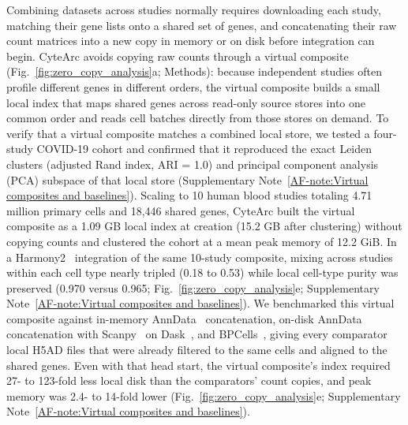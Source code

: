 \documentclass[11pt]{article}
\newcommand{\sref}[1]{\ref*{AF-#1}}
\begin{document}
Combining datasets across studies normally requires downloading each study, matching their gene lists onto a shared set of genes, and concatenating their raw count matrices into a new copy in memory or on disk before integration can begin. CyteArc avoids copying raw counts through a virtual composite (Fig.~\ref{fig:zero_copy_analysis}a; Methods): because independent studies often profile different genes in different orders, the virtual composite builds a small local index that maps shared genes across read-only source stores into one common order and reads cell batches directly from those stores on demand. To verify that a virtual composite matches a combined local store, we tested a four-study COVID-19 cohort and confirmed that it reproduced the exact Leiden~\cite{traag2019} clusters (adjusted Rand index, ARI = 1.0) and principal component analysis (PCA) subspace of that local store (Supplementary Note~\sref{note:Virtual composites and baselines}). Scaling to 10 human blood studies totaling 4.71 million primary cells and 18,446 shared genes, CyteArc built the virtual composite as a 1.09 GB local index at creation (15.2 GB after clustering) without copying counts and clustered the cohort at a mean peak memory of 12.2 GiB. In a Harmony2~\cite{korsunsky2019,patikas2026integration} integration of the same 10-study composite, mixing across studies within each cell type nearly tripled (0.18 to 0.53) while local cell-type purity was preserved (0.970 versus 0.965; Fig.~\ref{fig:zero_copy_analysis}e; Supplementary Note~\sref{note:Virtual composites and baselines}). We benchmarked this virtual composite against in-memory AnnData~\cite{virshup2024} concatenation, on-disk AnnData concatenation with Scanpy~\cite{wolf2018} on Dask~\cite{scanpydask}, and BPCells~\cite{parks2025bpcells}, giving every comparator local H5AD files that were already filtered to the same cells and aligned to the shared genes. Even with that head start, the virtual composite's index required 27- to 123-fold less local disk than the comparators' count copies, and peak memory was 2.4- to 14-fold lower (Fig.~\ref{fig:zero_copy_analysis}e; Supplementary Note~\sref{note:Virtual composites and baselines}).
\end{document}
